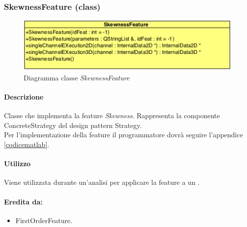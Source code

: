 \begin{itemize}
	\end{itemize}

\color{black}
\pagebreak
\subsubsection{SkewnessFeature (class)}
\label{SkewnessFeature}
\begin{figure}[!h]
\centering
			\includegraphics[scale=1]{./Content/Immagini/modelCore/SkewnessFeature.png}
			\caption{Diagramma classe \textsl{SkewnessFeature}}
			\label{skewnessFeature_img}
\end{figure}

\paragraph{Descrizione \\} Classe che implementa la feature\g{} \textit{Skewness}. Rappresenta la componente ConcreteStrategy del design pattern\g{} Strategy.
\\Per l'implementazione della feature\g{} il programmatore dovrà seguire l'appendice \ref{codicematlab}.

\paragraph{Utilizzo\\} Viene utilizzata durante un'analisi per applicare la feature\g{} a un \dataset{}.

\paragraph{Eredita da:}
\begin{itemize}
	\item FirstOrderFeature.
\end{itemize}

